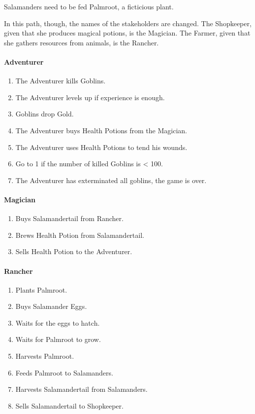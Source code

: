 Salamanders need to be fed Palmroot, a ficticious plant.

In this path, though, the names of the stakeholders are changed.
The Shopkeeper, given that she produces magical potions,
is the Magician. The Farmer, given that she gathers
resources from animals, is the Rancher.

\paragraph{Adventurer}
\begin{enumerate}
	\item The Adventurer kills Goblins.
	\item The Adventurer levels up if experience is enough.
	\item Goblins drop Gold.
	\item The Adventurer buys Health Potions from the Magician.
	\item The Adventurer uses Health Potions to tend his wounds.
	\item Go to 1 if the number of killed Goblins is < 100.
	\item The Adventurer has exterminated all goblins, the game is over.
\end{enumerate}

\paragraph{Magician}
\begin{enumerate}
	\item Buys Salamandertail from Rancher.
	\item Brews Health Potion from Salamandertail.
	\item Sells Health Potion to the Adventurer.
\end{enumerate}

\paragraph{Rancher}
\begin{enumerate}
	\item Plants Palmroot.
	\item Buys Salamander Eggs.
	\item Waits for the eggs to hatch.
	\item Waits for Palmroot to grow.
	\item Harvests Palmroot.
	\item Feeds Palmroot to Salamanders.
	\item Harvests Salamandertail from Salamanders.
	\item Sells Salamandertail to Shopkeeper.
\end{enumerate}

